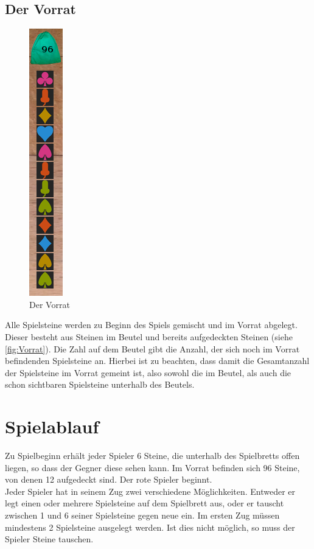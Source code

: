 \documentclass[a4paper, ngerman]{scrartcl}
\begin{document}
\subsection{Der Vorrat}
\begin{figure}
	\centering
	\includegraphics[scale = 0.5]{images/Vorratsbeutel}
	\caption{Der Vorrat}
	\label{fig:Vorrat}
\end{figure}
 Alle Spielsteine werden zu Beginn des Spiels gemischt und im Vorrat abgelegt. Dieser besteht aus Steinen im Beutel und bereits aufgedeckten Steinen (siehe \autoref{fig:Vorrat}). Die Zahl auf dem Beutel gibt die Anzahl, der sich noch im Vorrat befindenden Spielsteine an. Hierbei ist zu beachten, dass damit die Gesamtanzahl der Spielsteine im Vorrat gemeint ist, also sowohl die im Beutel, als auch die schon sichtbaren Spielsteine unterhalb des Beutels.\\

\section{Spielablauf}
	Zu Spielbeginn erhält jeder Spieler 6 Steine, die unterhalb des Spielbretts offen liegen, so dass der Gegner diese sehen kann. Im Vorrat befinden sich 96 Steine, von denen 12 aufgedeckt sind. Der rote Spieler beginnt.\\
 Jeder Spieler hat in seinem Zug zwei verschiedene Möglichkeiten. Entweder er legt einen oder mehrere Spielsteine auf dem Spielbrett aus, oder er tauscht zwischen 1 und 6 seiner Spielsteine gegen neue ein. Im ersten Zug müssen mindestens 2 Spielsteine ausgelegt werden. Ist dies nicht möglich, so muss der Spieler Steine tauschen.
 \newpage
	
\end{document}
